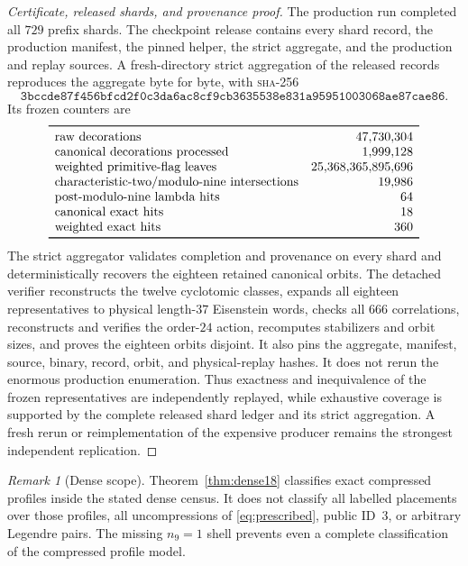 \documentclass[11pt]{article}
\theoremstyle{remark}
\newtheorem{remark}[theorem]{Remark}
\newcommand{\sha}{\textsc{sha-256}}
\begin{document}
\begin{proof}[Certificate, released shards, and provenance proof]
The production run completed all $729$ prefix shards.  The checkpoint
release contains every shard record, the production manifest, the pinned
helper, the strict aggregate, and the production and replay sources.  A
fresh-directory strict aggregation of the released records reproduces the
aggregate byte for byte, with \sha{}
\[
\texttt{3bccde87f456bfcd2f0c3da6ac8cf9cb3635538e831a95951003068ae87cae86}.
\]
Its frozen counters
are
\[
\begin{array}{lr}
\toprule
\text{raw decorations}&47{,}730{,}304\\
\text{canonical decorations processed}&1{,}999{,}128\\
\text{weighted primitive-flag leaves}&25{,}368{,}365{,}895{,}696\\
\text{characteristic-two/modulo-nine intersections}&19{,}986\\
\text{post-modulo-nine lambda hits}&64\\
\text{canonical exact hits}&18\\
\text{weighted exact hits}&360\\
\bottomrule
\end{array}
\]
The strict aggregator validates completion and provenance on every shard
and deterministically recovers the eighteen retained canonical orbits.
The detached verifier reconstructs the twelve cyclotomic classes, expands
all eighteen representatives to physical length-$37$ Eisenstein words,
checks all $666$ correlations, reconstructs and verifies the order-$24$
action, recomputes stabilizers and orbit sizes, and proves the eighteen
orbits disjoint.  It also pins the aggregate, manifest, source, binary,
record, orbit, and physical-replay hashes.  It does not rerun the enormous
production enumeration.  Thus exactness and inequivalence of the frozen
representatives are independently replayed, while exhaustive coverage is
supported by the complete released shard ledger and its strict aggregation.
A fresh rerun or reimplementation of the expensive producer remains the
strongest independent replication.
\end{proof}

\begin{remark}[Dense scope]
Theorem~\ref{thm:dense18} classifies exact compressed profiles inside the
stated dense census.  It does not classify all labelled placements over
those profiles, all uncompressions of \eqref{eq:prescribed}, public ID~3,
or arbitrary Legendre pairs.  The missing $n_9=1$ shell prevents even a
complete classification of the compressed profile model.
\end{remark}
\end{document}
